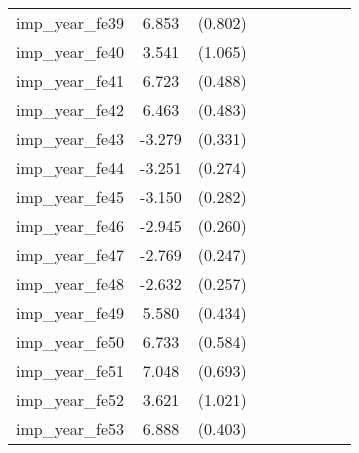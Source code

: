 {\begin{tabular}{l*{4}{cc}}
imp\_year\_fe39&    6.853\sym{***}&  (0.802)&                  &         &                  &         &                  &         \\
imp\_year\_fe40&    3.541\sym{***}&  (1.065)&                  &         &                  &         &                  &         \\
imp\_year\_fe41&    6.723\sym{***}&  (0.488)&                  &         &                  &         &                  &         \\
imp\_year\_fe42&    6.463\sym{***}&  (0.483)&                  &         &                  &         &                  &         \\
imp\_year\_fe43&   -3.279\sym{***}&  (0.331)&                  &         &                  &         &                  &         \\
imp\_year\_fe44&   -3.251\sym{***}&  (0.274)&                  &         &                  &         &                  &         \\
imp\_year\_fe45&   -3.150\sym{***}&  (0.282)&                  &         &                  &         &                  &         \\
imp\_year\_fe46&   -2.945\sym{***}&  (0.260)&                  &         &                  &         &                  &         \\
imp\_year\_fe47&   -2.769\sym{***}&  (0.247)&                  &         &                  &         &                  &         \\
imp\_year\_fe48&   -2.632\sym{***}&  (0.257)&                  &         &                  &         &                  &         \\
imp\_year\_fe49&    5.580\sym{***}&  (0.434)&                  &         &                  &         &                  &         \\
imp\_year\_fe50&    6.733\sym{***}&  (0.584)&                  &         &                  &         &                  &         \\
imp\_year\_fe51&    7.048\sym{***}&  (0.693)&                  &         &                  &         &                  &         \\
imp\_year\_fe52&    3.621\sym{***}&  (1.021)&                  &         &                  &         &                  &         \\
imp\_year\_fe53&    6.888\sym{***}&  (0.403)&                  &         &                  &         &                  &         \\

\end{tabular}}
